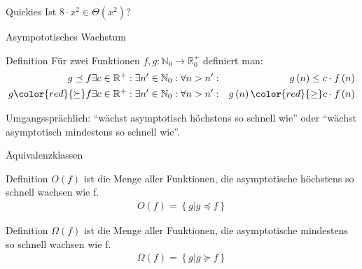 \begin{frame}{Quickies}
    Ist $8\cdot x^2 \in \Theta\left( x^2 \right)$?
\end{frame}
\begin{frame}{Asympototisches Wachstum}
    \begin{block}{Definition}
        Für zwei Funktionen $f,g: \mathbb{N}_0\rightarrow \mathbb{R}_0^+$ definiert man:
        \begin{align*}
            g\preceq f & \exists c \in \mathbb{R}^+: \exists n' \in \mathbb{N}_0: \forall n > n': & g\left( n \right) \leq c\cdot f\left( n \right)\\
            g\color{red}{\succeq} f & \exists c \in \mathbb{R}^+: \exists n' \in \mathbb{N}_0: \forall n > n': & g\left( n \right) \color{red}{\geq} c\cdot f\left( n \right)
        \end{align*}
    \end{block}
    Umgangssprächlich: ``wächst asymptotisch höchstens so schnell wie'' oder ``wächst asymptotisch mindestens so schnell wie''.
\end{frame}
\begin{frame}{Äquivalenzklassen}
    \begin{block}{Definition}
        $O(f)$ ist die Menge aller Funktionen, die asymptotische höchstens so schnell wachsen wie f.
        \begin{align*}
            O\left( f \right) = \left\{ g\big| g\preceq f \right\}
        \end{align*}
    \end{block}
    \begin{block}{Definition}
        $\Omega(f)$ ist die Menge aller Funktionen, die asymptotische mindestens so schnell wachsen wie f.
        \begin{align*}
            \Omega\left( f \right) = \left\{ g\big| g\succeq f \right\}
        \end{align*}
    \end{block}
\end{frame}

